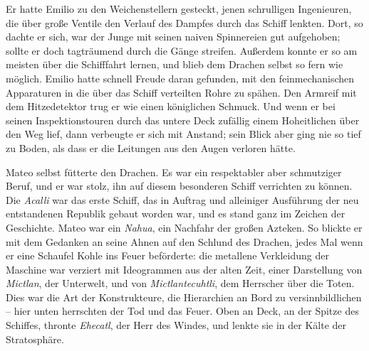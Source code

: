 \bigpar

Er hatte Emilio zu den Weichenstellern gesteckt, jenen schrulligen
Ingenieuren, die über große Ventile den Verlauf des Dampfes durch
das Schiff lenkten. Dort, so dachte er sich, war der Junge mit
seinen naiven Spinnereien gut aufgehoben; sollte er doch
tagträumend durch die Gänge streifen. Außerdem konnte er so am
meisten über die Schifffahrt lernen, und blieb dem Drachen selbst
so fern wie möglich. Emilio hatte schnell Freude daran gefunden,
mit den feinmechanischen Apparaturen in die über das Schiff
verteilten Rohre zu spähen. Den Armreif mit dem Hitzedetektor trug
er wie einen königlichen Schmuck. Und wenn er bei seinen
Inspektionstouren durch das untere Deck zufällig einem Hoheitlichen
über den Weg lief, dann verbeugte er sich mit Anstand; sein Blick
aber ging nie so tief zu Boden, als dass er die Leitungen aus den
Augen verloren hätte.

\bigpar

Mateo selbst fütterte den Drachen. Es war ein respektabler aber
schmutziger Beruf, und er war stolz, ihn auf diesem besonderen
Schiff verrichten zu können. Die \textit{Acalli} war das erste Schiff, das
in Auftrag und alleiniger Ausführung der neu entstandenen Republik
gebaut worden war, und es stand ganz im Zeichen der Geschichte.
Mateo war ein \textit{Nahua}, ein Nachfahr der großen Azteken. So blickte er
mit dem Gedanken an seine Ahnen auf den Schlund des Drachen, jedes
Mal wenn er eine Schaufel Kohle ins Feuer beförderte: die metallene
Verkleidung der Maschine war verziert mit Ideogrammen aus der alten
Zeit, einer Darstellung von \textit{Mictlan}, der Unterwelt, und von
\textit{Mictlantecuhtli}, dem Herrscher über die Toten. Dies war die Art der
Konstrukteure, die Hierarchien an Bord zu versinnbildlichen – hier
unten herrschten der Tod und das Feuer. Oben an Deck, an der Spitze
des Schiffes, thronte \textit{Ehecatl}, der Herr des Windes, und lenkte sie
in der Kälte der Stratosphäre.


